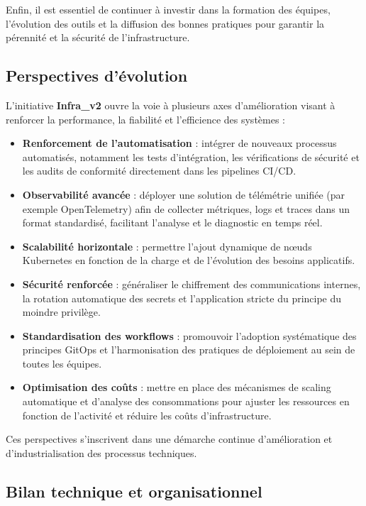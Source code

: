 Enfin, il est essentiel de continuer à investir dans la formation des équipes, l’évolution des outils et la diffusion des bonnes pratiques pour garantir la pérennité et la sécurité de l’infrastructure.

\subsection{Perspectives d’évolution}

L’initiative \textbf{Infra\_v2} ouvre la voie à plusieurs axes d’amélioration visant à renforcer la performance, la fiabilité et l’efficience des systèmes :

\begin{itemize}
	\item \textbf{Renforcement de l’automatisation} : intégrer de nouveaux processus automatisés, notamment les tests d’intégration, les vérifications de sécurité et les audits de conformité directement dans les pipelines CI/CD.
	\item \textbf{Observabilité avancée} : déployer une solution de télémétrie unifiée (par exemple OpenTelemetry) afin de collecter métriques, logs et traces dans un format standardisé, facilitant l’analyse et le diagnostic en temps réel.
	\item \textbf{Scalabilité horizontale} : permettre l’ajout dynamique de nœuds Kubernetes en fonction de la charge et de l’évolution des besoins applicatifs.
	\item \textbf{Sécurité renforcée} : généraliser le chiffrement des communications internes, la rotation automatique des secrets et l’application stricte du principe du moindre privilège.
	\item \textbf{Standardisation des workflows} : promouvoir l’adoption systématique des principes GitOps et l’harmonisation des pratiques de déploiement au sein de toutes les équipes.
	\item \textbf{Optimisation des coûts} : mettre en place des mécanismes de scaling automatique et d’analyse des consommations pour ajuster les ressources en fonction de l’activité et réduire les coûts d’infrastructure.
\end{itemize}

Ces perspectives s’inscrivent dans une démarche continue d’amélioration et d’industrialisation des processus techniques.

\subsection{Bilan technique et organisationnel}

